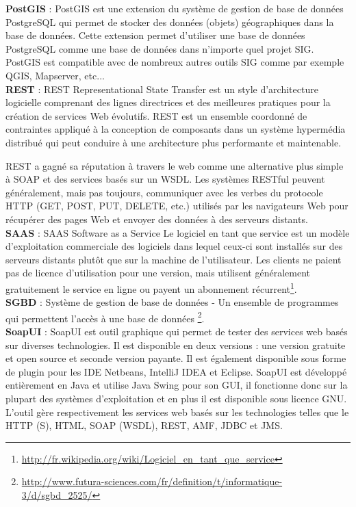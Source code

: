 \pagebreak

\textbf{PostGIS}\label{Postgis} : PostGIS est une extension du système de gestion de base de données PostgreSQL qui permet de stocker des données (objets) géographiques dans la base de données. Cette extension permet d'utiliser une base de données PostgreSQL comme une base de données dans n'importe quel projet SIG. PostGIS est compatible avec de nombreux autres outils SIG comme par exemple QGIS, Mapserver, etc...\\

\textbf{REST} : REST \og Representational State Transfer \fg ​​est un style d'architecture logicielle comprenant des lignes directrices et des meilleures pratiques pour la création de services Web évolutifs. REST est un ensemble coordonné de contraintes appliqué à la conception de composants dans un système hypermédia distribué qui peut conduire à une architecture plus performante et maintenable.

REST a gagné sa réputation à travers le web comme une alternative plus simple à SOAP et des services basés sur un WSDL. Les systèmes \og RESTful \fg peuvent généralement, mais pas toujours, communiquer avec les verbes du protocole HTTP (GET, POST, PUT, DELETE, etc.) utilisés par les navigateurs Web pour récupérer des pages Web et envoyer des données à des serveurs distants.\\


\textbf{SAAS} : SAAS \og Software as a Service \fg Le logiciel en tant que service est un modèle d'exploitation commerciale des logiciels dans lequel ceux-ci sont installés sur des serveurs distants plutôt que sur la machine de l'utilisateur. Les clients ne paient pas de licence d'utilisation pour une version, mais utilisent généralement gratuitement le service en ligne ou payent un abonnement récurrent\footnote{\url{http://fr.wikipedia.org/wiki/Logiciel_en_tant_que_service}}.\\

\textbf{SGBD} : Système de gestion de base de données - Un ensemble de programmes qui permettent l'accès à une base de données \footnote{\url{http://www.futura-sciences.com/fr/definition/t/informatique-3/d/sgbd_2525/}}.\\


\textbf{SoapUI} : SoapUI est outil graphique qui permet de tester des services web basés sur diverses technologies. Il est disponible en deux versions : une version gratuite et open source et seconde version payante. Il est également disponible sous forme de plugin pour les IDE Netbeans, IntelliJ IDEA et Eclipse. SoapUI est développé entièrement en Java et utilise Java Swing pour son GUI, il fonctionne donc sur la plupart des systèmes d'exploitation et en plus il est disponible sous licence GNU.
L'outil gère respectivement les services web basés sur les technologies telles que le HTTP (S), HTML, SOAP (WSDL), REST, AMF, JDBC et JMS.\\

